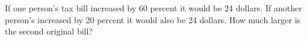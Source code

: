 If one person's tax bill increased by 60 percent it would be 24 dollars. If another person's increased by 20 percent it would also be 24 dollars. How much larger is the second original bill?
